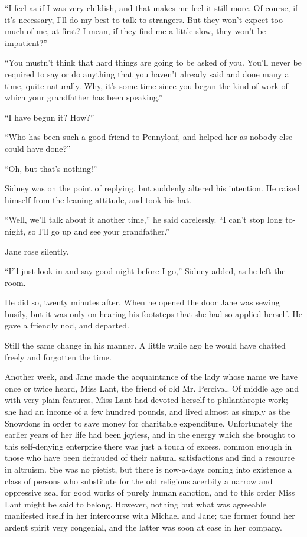 ``I feel as if I was very childish, and that makes me feel it still
more. Of course, if it's necessary, I'll do my best to talk to
strangers. {}But they won't expect too much of me, at first? I mean, if
they find me a little slow, they won't be impatient?''

``You mustn't think that hard things are going to be asked of you.
You'll never be required to say or do anything that you haven't already
said and done many a time, quite naturally. Why, it's some time since
you began the kind of work of which your grandfather has been
speaking.''

``I have begun it? How?''

``Who has been such a good friend to Pennyloaf, and helped her as nobody
else could have done?''

``Oh, but that's nothing!''

Sidney was on the point of replying, but suddenly altered his intention.
He raised himself from the leaning attitude, and took his hat.

``Well, we'll talk about it another time,'' he said carelessly. ``I
can't stop long to-night, so I'll go up and see your grandfather.''

Jane rose silently.

``I'll just look in and say good-night before I go,'' Sidney added, as
he left the room.

{}He did so, twenty minutes after. When he opened the door Jane was
sewing busily, but it was only on hearing his footsteps that she had so
applied herself. He gave a friendly nod, and departed.

Still the same change in his manner. A little while ago he would have
chatted freely and forgotten the time.

Another week, and Jane made the acquaintance of the lady whose name we
have once or twice heard, Miss Lant, the friend of old Mr. Percival. Of
middle age and with very plain features, Miss Lant had devoted herself
to philanthropic work; she had an income of a few hundred pounds, and
lived almost as simply as the Snowdons in order to save money for
charitable expenditure. Unfortunately the earlier years of her life had
been joyless, and in the energy which she brought to this self-denying
enterprise there was just a touch of excess, common enough in those who
have been defrauded of their natural satisfactions and find a resource
in altruism. She was no pietist, but there is now-a-days {}coming into
existence a class of persons who substitute for the old religious
acerbity a narrow and oppressive zeal for good works of purely human
sanction, and to this order Miss Lant might be said to belong. However,
nothing but what was agreeable manifested itself in her intercourse with
Michael and Jane; the former found her ardent spirit very congenial, and
the latter was soon at ease in her company.

